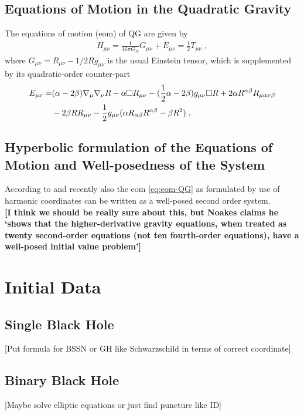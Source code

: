 \documentclass[a4paper,oneside,openany,11pt]{memoir}
\numberwithin{equation}{section} %
\newcommand{\aaron}[1]{{\color{OliveGreen} #1}}
\newcommand{\NOTE}[1]{{\color{blue}[#1]}}
\begin{document}
\subsection{Equations of Motion in the Quadratic Gravity}

The equations of motion (eom) of QG are given by
\begin{align}
\label{eq:eom-QG}
	H_{\mu\nu}=\frac{1}{16 \pi G_N} G_{\mu\nu} + E_{\mu\nu}=\frac{1}{2}T_{\mu\nu}\;,
\end{align}
where $G_{\mu\nu} = R_{\mu\nu} -1/2 R g_{\mu\nu}$ is the usual Einstein tensor, which is supplemented by its quadratic-order counter-part
\begin{align}
	E_{\mu\nu} = &(\alpha-2\beta)\nabla_\mu\nabla_\nu R-\alpha \square R_{\mu\nu}-(\frac{1}{2}\alpha-2\beta)g_{\mu\nu}\square R
+2\alpha R^{\alpha\beta}R_{\mu\alpha\nu\beta}
	\notag\\
	&-2\beta R R_{\mu\nu}-\frac{1}{2}g_{\mu\nu}(\alpha R_{\alpha\beta}R^{\alpha\beta}-\beta R^2)\;.
\end{align}

\subsection{Hyperbolic formulation of the Equations of Motion and Well-posedness of the System}

According to \cite{Noakes:1983} and recently also \cite{Morales:2018imi} the eom \eqref{eq:eom-QG} as formulated by use of harmonic coordinates can be written as a well-posed second order system.
\\
\aaron{\textbf{[I think we should be really sure about this, but Noakes claims he `shows that the higher-derivative gravity equations, when treated as twenty second-order equations (not ten fourth-order equations), have a well-posed initial value problem']}}


\section{Initial Data}
\subsection{Single Black Hole}
\NOTE{Put formula for BSSN or GH like Schwarzschild in terms of correct coordinate}
\subsection{Binary Black Hole}
\NOTE{Maybe solve elliptic equations or just find puncture like ID}
\end{document}
